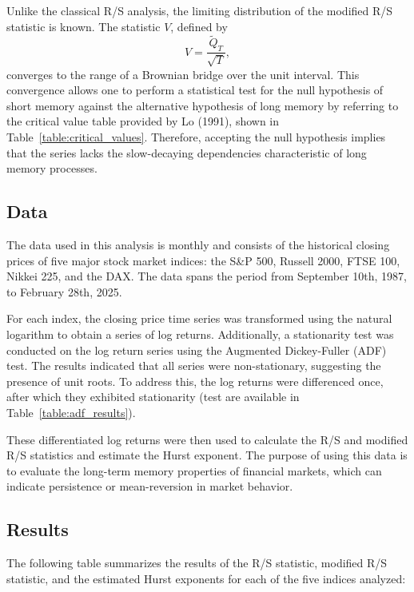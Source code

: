 \documentclass[11pt]{extarticle}
\begin{document}
Unlike the classical R/S analysis, the limiting distribution of the modified R/S statistic is known. The statistic \(V\), defined by
\begin{equation}
    V = \frac{\tilde{Q}_T}{\sqrt{T}},
\end{equation}
converges to the range of a Brownian bridge over the unit interval.
This convergence allows one to perform a statistical test for the null hypothesis of short memory against the
alternative hypothesis of long memory by referring to the critical value table provided by Lo (1991), shown in Table~\ref{table:critical_values}.
Therefore, accepting the null hypothesis implies that the series lacks the slow-decaying dependencies characteristic of long memory processes.

\subsection{Data}
\label{sec:data}

The data used in this analysis is monthly and consists of the historical closing prices of five major stock market indices: the S\&P 500,
Russell 2000, FTSE 100, Nikkei 225, and the DAX.
The data spans the period from September 10th, 1987, to February 28th, 2025.

For each index, the closing price time series was transformed using the natural logarithm to obtain a series of log returns.
Additionally, a stationarity test was conducted on the log return series using the Augmented Dickey-Fuller (ADF) test.
The results indicated that all series were non-stationary, suggesting the presence of unit roots.
To address this, the log returns were differenced once, after which they exhibited stationarity (test are available
in Table~\ref{table:adf_results}).

These differentiated log returns were then used to calculate the R/S and modified R/S statistics and estimate the Hurst exponent.
The purpose of using this data is to evaluate the long-term memory properties of financial markets, which can indicate persistence or mean-reversion in market behavior.



\subsection{Results}
\label{sec:results}

The following table summarizes the results of the R/S statistic, modified R/S statistic, and the estimated Hurst exponents for each of the five indices analyzed: \\
\end{document}
